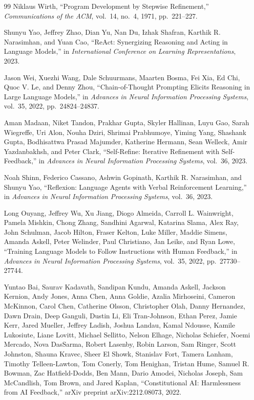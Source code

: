 \documentclass[11pt]{article}
\begin{document}
\begin{thebibliography}{99}
Niklaus Wirth,
``Program Development by Stepwise Refinement,''
\textit{Communications of the ACM},
vol.~14,
no.~4,
1971,
pp.~221--227.

Shunyu Yao, Jeffrey Zhao, Dian Yu, Nan Du,
Izhak Shafran, Karthik R. Narasimhan, and Yuan Cao,
``ReAct: Synergizing Reasoning and Acting in Language Models,''
in \textit{International Conference on Learning Representations},
2023.

Jason Wei, Xuezhi Wang, Dale Schuurmans, Maarten Bosma,
Fei Xia, Ed Chi, Quoc V. Le, and Denny Zhou,
``Chain-of-Thought Prompting Elicits Reasoning in Large Language Models,''
in \textit{Advances in Neural Information Processing Systems},
vol.~35,
2022,
pp.~24824--24837.

Aman Madaan, Niket Tandon, Prakhar Gupta, Skyler Hallinan,
Luyu Gao, Sarah Wiegreffe, Uri Alon, Nouha Dziri,
Shrimai Prabhumoye, Yiming Yang, Shashank Gupta,
Bodhisattwa Prasad Majumder, Katherine Hermann,
Sean Welleck, Amir Yazdanbakhsh, and Peter Clark,
``Self-Refine: Iterative Refinement with Self-Feedback,''
in \textit{Advances in Neural Information Processing Systems},
vol.~36,
2023.

Noah Shinn, Federico Cassano, Ashwin Gopinath,
Karthik R. Narasimhan, and Shunyu Yao,
``Reflexion: Language Agents with Verbal Reinforcement Learning,''
in \textit{Advances in Neural Information Processing Systems},
vol.~36,
2023.

Long Ouyang, Jeffrey Wu, Xu Jiang, Diogo Almeida,
Carroll L. Wainwright, Pamela Mishkin, Chong Zhang,
Sandhini Agarwal, Katarina Slama, Alex Ray,
John Schulman, Jacob Hilton, Fraser Kelton,
Luke Miller, Maddie Simens, Amanda Askell,
Peter Welinder, Paul Christiano, Jan Leike, and Ryan Lowe,
``Training Language Models to Follow Instructions with Human Feedback,''
in \textit{Advances in Neural Information Processing Systems},
vol.~35,
2022,
pp.~27730--27744.

Yuntao Bai, Saurav Kadavath, Sandipan Kundu,
Amanda Askell, Jackson Kernion, Andy Jones,
Anna Chen, Anna Goldie, Azalia Mirhoseini,
Cameron McKinnon, Carol Chen, Catherine Olsson,
Christopher Olah, Danny Hernandez, Dawn Drain,
Deep Ganguli, Dustin Li, Eli Tran-Johnson,
Ethan Perez, Jamie Kerr, Jared Mueller,
Jeffrey Ladish, Joshua Landau, Kamal Ndousse,
Kamile Lukosiute, Liane Lovitt, Michael Sellitto,
Nelson Elhage, Nicholas Schiefer, Noemi Mercado,
Nova DasSarma, Robert Lasenby, Robin Larson,
Sam Ringer, Scott Johnston, Shauna Kravec,
Sheer El Showk, Stanislav Fort, Tamera Lanham,
Timothy Telleen-Lawton, Tom Conerly,
Tom Henighan, Tristan Hume, Samuel R. Bowman,
Zac Hatfield-Dodds, Ben Mann, Dario Amodei,
Nicholas Joseph, Sam McCandlish, Tom Brown,
and Jared Kaplan,
``Constitutional AI: Harmlessness from AI Feedback,''
arXiv preprint arXiv:2212.08073,
2022.


\end{thebibliography}
\end{document}

